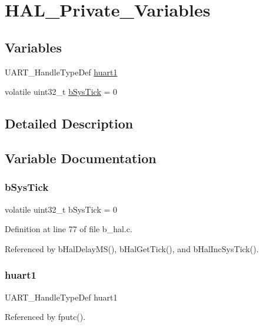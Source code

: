 \hypertarget{group___h_a_l___private___variables}{}\section{H\+A\+L\+\_\+\+Private\+\_\+\+Variables}
\label{group___h_a_l___private___variables}
\subsection*{Variables}
\begin{DoxyCompactItemize}
\item 
U\+A\+R\+T\+\_\+\+Handle\+Type\+Def \mbox{\hyperlink{group___h_a_l___private___variables_ga2cf715bef37f7e8ef385a30974a5f0d5}{huart1}}
\item 
volatile uint32\+\_\+t \mbox{\hyperlink{group___h_a_l___private___variables_gaf4192a6f2331016cae3bcd9e5f2c7e20}{b\+Sys\+Tick}} = 0
\end{DoxyCompactItemize}


\subsection{Detailed Description}


\subsection{Variable Documentation}
\mbox{\label{group___h_a_l___private___variables_gaf4192a6f2331016cae3bcd9e5f2c7e20}} 
\subsubsection{\texorpdfstring{b\+Sys\+Tick}{bSysTick}}
{\footnotesize\ttfamily volatile uint32\+\_\+t b\+Sys\+Tick = 0}



Definition at line 77 of file b\+\_\+hal.\+c.



Referenced by b\+Hal\+Delay\+M\+S(), b\+Hal\+Get\+Tick(), and b\+Hal\+Inc\+Sys\+Tick().

\mbox{\label{group___h_a_l___private___variables_ga2cf715bef37f7e8ef385a30974a5f0d5}} 
\subsubsection{\texorpdfstring{huart1}{huart1}}
{\footnotesize\ttfamily U\+A\+R\+T\+\_\+\+Handle\+Type\+Def huart1}



Referenced by fputc().

